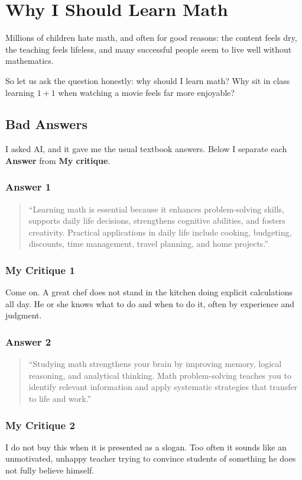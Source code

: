 \chapter{Why I Should Learn Math}
Millions of children hate math, and often for good reasons: the content feels
dry, the teaching feels lifeless, and many successful people seem to live well
without mathematics.

So let us ask the question honestly: why should I learn math?  Why sit in class
learning \(1+1\) when watching a movie feels far more enjoyable?

\section{Bad Answers}

I asked AI, and it gave me the usual textbook answers.  Below I separate each
\textbf{Answer} from \textbf{My critique}.

\subsection*{Answer 1}
\begin{quote}
``Learning math is essential because it enhances problem-solving skills,
supports daily life decisions, strengthens cognitive abilities, and fosters
creativity.  Practical applications in daily life include cooking, budgeting,
discounts, time management, travel planning, and home projects.''
\end{quote}

\subsection*{My Critique 1}
Come on.  A great chef does not stand in the kitchen doing explicit
calculations all day.  He or she knows what to do and when to do it, often by
experience and judgment.

\subsection*{Answer 2}
\begin{quote}
``Studying math strengthens your brain by improving memory, logical reasoning,
and analytical thinking.  Math problem-solving teaches you to identify relevant
information and apply systematic strategies that transfer to life and work.''
\end{quote}

\subsection*{My Critique 2}
I do not buy this when it is presented as a slogan.  Too often it sounds like
an unmotivated, unhappy teacher trying to convince students of something he
does not fully believe himself.

